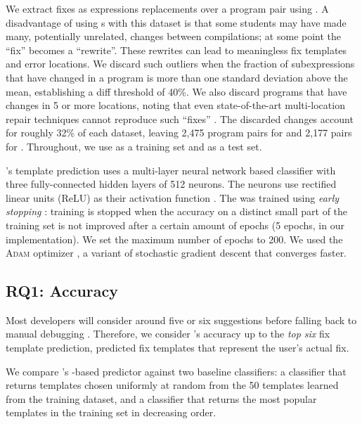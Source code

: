 %
We extract fixes as expressions replacements over a program pair using \diffsym.
A disadvantage of using \diffsym s with this dataset is that some students may
have made many, potentially unrelated, changes between compilations; at some
point the ``fix'' becomes a ``rewrite''. These rewrites can lead to meaningless
fix templates and error locations. We discard such outliers when the fraction of
subexpressions that have changed in a program is more than one standard
deviation above the mean, establishing a diff threshold of 40\%. We also discard
programs that have changes in 5 or more locations, noting that even
state-of-the-art multi-location repair techniques cannot reproduce such
``fixes'' \citep{Saha_2019}. The discarded changes account for roughly 32\% of each
dataset, leaving 2,475 program pairs for \SPRING and 2,177 pairs for \FALL.
Throughout, we use \SPRING as a training set and \FALL as a test set.

%
\toolname's template prediction uses a multi-layer neural network \dnn based
classifier with three fully-connected hidden layers of 512 neurons. The neurons
use rectified linear units (ReLU) as their activation function
\citep{Nair2010-xg}.
%
The \dnn was trained using \emph{early stopping} \citep{Hastie2009-bn}: training
is stopped when the accuracy on a distinct small part of the training set is not
improved after a certain amount of epochs (5 epochs, in our implementation).
%
We set the maximum number of epochs to 200.
%
We used the \textsc{Adam} optimizer \citep{Kingma2014-ng},
a variant of stochastic gradient descent that converges faster.

\subsection{RQ1: Accuracy}

\label{sec:eval:accuracy}

Most developers will consider around five or six suggestions before falling back
to manual debugging \citep{Kochhar2016-oc,Parnin2011-ce}.
%
Therefore, we consider \toolname's accuracy up to the \emph{top six} fix
template prediction, \ie predicted fix templates that represent the user's
actual fix.

%
We compare \toolname's \dnn-based predictor against two baseline classifiers: a
\random classifier that returns templates chosen uniformly at random from the 50
templates learned from the \SPRING training dataset, and a \popular classifier
that returns the most popular templates in the training set in decreasing order.

